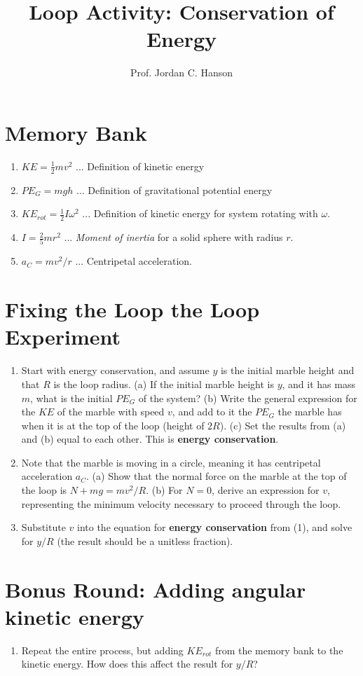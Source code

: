 \documentclass{article}
\begin{document}
\title{Loop Activity: Conservation of Energy}
\author{Prof. Jordan C. Hanson}

\maketitle

\section{Memory Bank}

\begin{enumerate}
\item $KE = \frac{1}{2}m v^2$ ... Definition of kinetic energy
\item $PE_G = mgh$ ... Definition of gravitational potential energy
\item $KE_{rot} = \frac{1}{2}I \omega^2$ ... Definition of kinetic energy for system rotating with $\omega$.
\item $I = \frac{2}{5}mr^2$ ... \textit{Moment of inertia} for a solid sphere with radius $r$.
\item $a_C = mv^2/r$ ... Centripetal acceleration.
\end{enumerate}

\section{Fixing the Loop the Loop Experiment}

\begin{enumerate}
\item Start with energy conservation, and assume $y$ is the initial marble height and that $R$ is the loop radius.  (a) If the initial marble height is $y$, and it has mass $m$, what is the initial $PE_G$ of the system? (b) Write the general expression for the $KE$ of the marble with speed $v$, and add to it the $PE_G$ the marble has when it is at the top of the loop (height of $2R$). (c) Set the results from (a) and (b) equal to each other.  This is \textbf{energy conservation}. \\ \vspace{1.5cm}
\item Note that the marble is moving in a circle, meaning it has centripetal acceleration $a_C$.  (a) Show that the normal force on the marble at the top of the loop is $N + mg = mv^2/R$. (b) For $N = 0$, derive an expression for $v$, representing the minimum velocity necessary to proceed through the loop. \\ \vspace{1.5cm}
\item Substitute $v$ into the equation for \textbf{energy conservation} from (1), and solve for $y/R$ (the result should be a unitless fraction). \\ \vspace{1.5cm}
\end{enumerate}

\section{Bonus Round: Adding angular kinetic energy}

\begin{enumerate}
\item Repeat the entire process, but adding $KE_{rot}$ from the memory bank to the kinetic energy.  How does this affect the result for $y/R$?
\end{enumerate}
\end{document}
